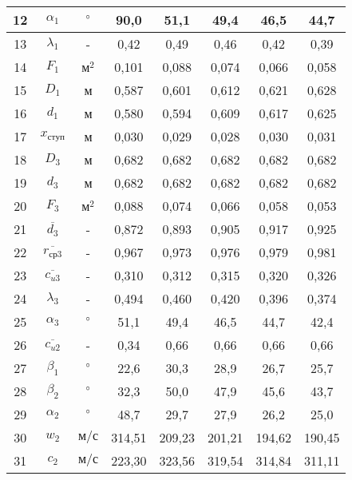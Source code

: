\begin{center}
\begin{longtable}{|c|c|c|c|c|c|c|c|}
				12 & $\alpha_1$ & $\degree$ & 90,0 & 51,1 & 49,4 & 46,5 & 44,7 \\\hline
			
				13 & $\lambda_1$ & - & 0,42 & 0,49 & 0,46 & 0,42 & 0,39 \\\hline
			
				14 & $F_1$ & $м^2$ & 0,101 & 0,088 & 0,074 & 0,066 & 0,058 \\\hline
			
				15 & $D_1$ & м & 0,587 & 0,601 & 0,612 & 0,621 & 0,628 \\\hline
			
				16 & $d_1$ & м & 0,580 & 0,594 & 0,609 & 0,617 & 0,625 \\\hline
			
				17 & $x_{ступ}$ & м & 0,030 & 0,029 & 0,028 & 0,030 & 0,031 \\\hline
			
				18 & $D_3$ & м & 0,682 & 0,682 & 0,682 & 0,682 & 0,682 \\\hline
			
				19 & $d_3$ & м & 0,682 & 0,682 & 0,682 & 0,682 & 0,682 \\\hline
			
				20 & $F_3$ & $м^2$ & 0,088 & 0,074 & 0,066 & 0,058 & 0,053 \\\hline
			
				21 & $\overline{d_3}$ & - & 0,872 & 0,893 & 0,905 & 0,917 & 0,925 \\\hline
			
				22 & $\overline{r_{ср3}}$ & - & 0,967 & 0,973 & 0,976 & 0,979 & 0,981 \\\hline
			
				23 & $\overline{c_{u3}}$ & - & 0,310 & 0,312 & 0,315 & 0,320 & 0,326 \\\hline
			
				24 & $\lambda_3$ & - & 0,494 & 0,460 & 0,420 & 0,396 & 0,374 \\\hline
			
				25 & $\alpha_3$ & $\degree$ & 51,1 & 49,4 & 46,5 & 44,7 & 42,4 \\\hline
			
				26 & $\overline{c_{u2}}$ & - & 0,34 & 0,66 & 0,66 & 0,66 & 0,66 \\\hline
			
				27 & $\beta_1$ & $\degree$ & 22,6 & 30,3 & 28,9 & 26,7 & 25,7 \\\hline
			
				28 & $\beta_2$ & $\degree$ & 32,3 & 50,0 & 47,9 & 45,6 & 43,7 \\\hline
			
				29 & $\alpha_2$ & $\degree$ & 48,7 & 29,7 & 27,9 & 26,2 & 25,0 \\\hline
			
				30 & $w_2$ & $м/с$ & 314,51 & 209,23 & 201,21 & 194,62 & 190,45 \\\hline
			
				31 & $c_2$ & $м/с$ & 223,30 & 323,56 & 319,54 & 314,84 & 311,11 \\\hline
			
		\end{longtable}
	\end{center}
